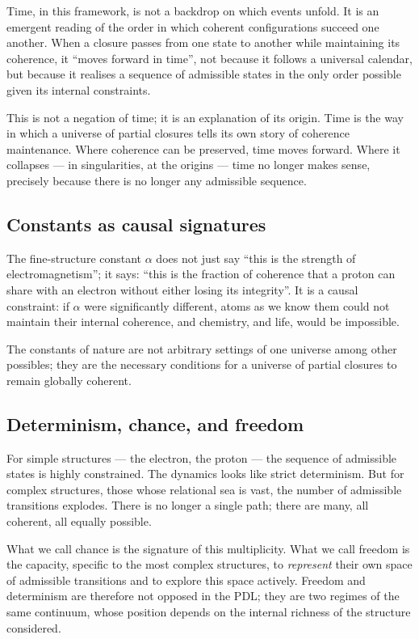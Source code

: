 \documentclass[11pt, a4paper, openright]{book}
\begin{document}
Time, in this framework, is not a backdrop on which events unfold. It is an emergent reading of the order in which coherent configurations succeed one another. When a closure passes from one state to another while maintaining its coherence, it “moves forward in time”, not because it follows a universal calendar, but because it realises a sequence of admissible states in the only order possible given its internal constraints.

\medskip

This is not a negation of time; it is an explanation of its origin. Time is the way in which a universe of partial closures tells its own story of coherence maintenance. Where coherence can be preserved, time moves forward. Where it collapses — in singularities, at the origins — time no longer makes sense, precisely because there is no longer any admissible sequence.

\subsection*{Constants as causal signatures}

The fine-structure constant $\alpha$ does not just say “this is the strength of electromagnetism”; it says: “this is the fraction of coherence that a proton can share with an electron without either losing its integrity”. It is a causal constraint: if $\alpha$ were significantly different, atoms as we know them could not maintain their internal coherence, and chemistry, and life, would be impossible.

\medskip

The constants of nature are not arbitrary settings of one universe among other possibles; they are the necessary conditions for a universe of partial closures to remain globally coherent.

\subsection*{Determinism, chance, and freedom}

For simple structures — the electron, the proton — the sequence of admissible states is highly constrained. The dynamics looks like strict determinism. But for complex structures, those whose relational sea is vast, the number of admissible transitions explodes. There is no longer a single path; there are many, all coherent, all equally possible.

\medskip

What we call chance is the signature of this multiplicity. What we call freedom is the capacity, specific to the most complex structures, to \emph{represent} their own space of admissible transitions and to explore this space actively. Freedom and determinism are therefore not opposed in the PDL; they are two regimes of the same continuum, whose position depends on the internal richness of the structure considered.
\end{document}
